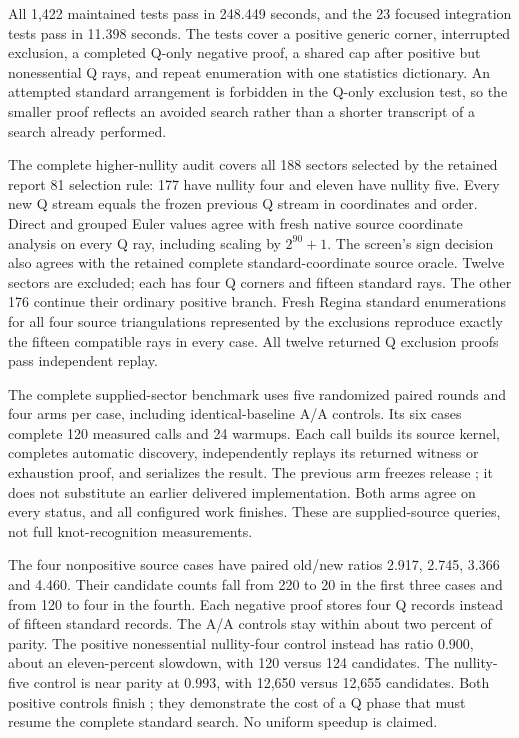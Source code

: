 All 1,422 maintained tests pass in 248.449 seconds, and the 23 focused
integration tests pass in 11.398 seconds. The tests cover a positive generic
corner, interrupted exclusion, a completed Q-only negative proof, a shared
cap after positive but nonessential Q rays, and repeat enumeration with one
statistics dictionary. An attempted standard arrangement is forbidden in
the Q-only exclusion test, so the smaller proof reflects an avoided search
rather than a shorter transcript of a search already performed.

The complete higher-nullity audit covers all 188 sectors selected by the
retained report 81 selection rule: 177 have nullity four and eleven have
nullity five. Every new Q stream equals the frozen previous Q stream in
coordinates and order. Direct and grouped Euler values agree with fresh
native source coordinate analysis on every Q ray, including scaling by
$2^{90}+1$. The screen's sign decision also agrees with the retained complete
standard-coordinate source oracle. Twelve sectors are excluded; each has
four Q corners and fifteen standard rays. The other 176 continue their
ordinary positive branch. Fresh Regina standard enumerations for all four
source triangulations represented by the exclusions reproduce exactly the
fifteen compatible rays in every case. All twelve returned Q exclusion
proofs pass independent replay.

The complete supplied-sector benchmark uses five randomized paired rounds
and four arms per case, including identical-baseline A/A controls. Its six
cases complete 120 measured calls and 24 warmups. Each call builds its source
kernel, completes automatic discovery, independently replays its returned
witness or exhaustion proof, and serializes the result. The previous arm
freezes release ; it does not substitute an earlier delivered
implementation. Both arms agree on every status, and all configured work
finishes. These are supplied-source queries, not full knot-recognition
measurements.



The four nonpositive source cases have paired old/new ratios 2.917, 2.745,
3.366 and 4.460. Their candidate counts fall from 220 to 20 in the first
three cases and from 120 to four in the fourth. Each negative proof stores
four Q records instead of fifteen standard records. The A/A controls stay
within about two percent of parity. The positive nonessential nullity-four
control instead has ratio 0.900, about an eleven-percent slowdown, with
120 versus 124 candidates. The nullity-five control is near parity at
0.993, with 12,650 versus 12,655 candidates. Both positive controls finish
; they demonstrate the cost of a Q phase
that must resume the complete standard search. No uniform speedup is claimed.



